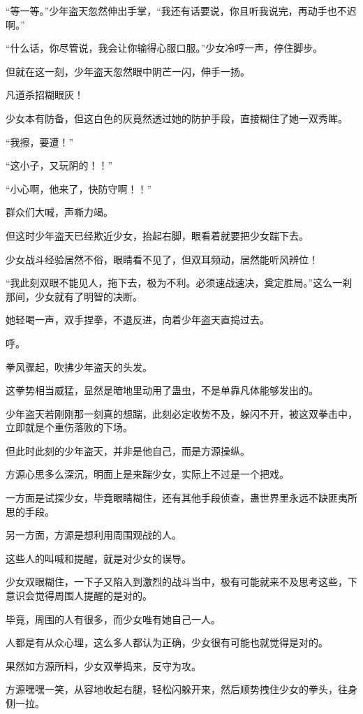 \begin{this_body}
“等一等。”少年盗天忽然伸出手掌，“我还有话要说，你且听我说完，再动手也不迟啊。”

“什么话，你尽管说，我会让你输得心服口服。”少女冷哼一声，停住脚步。

但就在这一刻，少年盗天忽然眼中阴芒一闪，伸手一扬。

凡道杀招糊眼灰！

少女本有防备，但这白色的灰竟然透过她的防护手段，直接糊住了她一双秀眸。

“我擦，要遭！”

“这小子，又玩阴的！！”

“小心啊，他来了，快防守啊！！”

群众们大喊，声嘶力竭。

但这时少年盗天已经欺近少女，抬起右脚，眼看着就要把少女踹下去。

少女战斗经验居然不俗，眼睛看不见了，但双耳频动，居然能听风辨位！

“我此刻双眼不能见人，拖下去，极为不利。必须速战速决，奠定胜局。”这么一刹那间，少女就有了明智的决断。

她轻喝一声，双手捏拳，不退反进，向着少年盗天直捣过去。

呼。

拳风骤起，吹拂少年盗天的头发。

这拳势相当威猛，显然是暗地里动用了蛊虫，不是单靠凡体能够发出的。

少年盗天若刚刚那一刻真的想踹，此刻必定收势不及，躲闪不开，被这双拳击中，立即就是个重伤落败的下场。

但此时此刻的少年盗天，并非是他自己，而是方源操纵。

方源心思多么深沉，明面上是来踹少女，实际上不过是一个把戏。

一方面是试探少女，毕竟眼睛糊住，还有其他手段侦查，蛊世界里永远不缺匪夷所思的手段。

另一方面，方源是想利用周围观战的人。

这些人的叫喊和提醒，就是对少女的误导。

少女双眼糊住，一下子又陷入到激烈的战斗当中，极有可能就来不及思考这些，下意识会觉得周围人提醒的是对的。

毕竟，周围的人有很多，而少女唯有她自己一人。

人都是有从众心理，这么多人都认为正确，少女很有可能也就觉得是对的。

果然如方源所料，少女双拳捣来，反守为攻。

方源嘿嘿一笑，从容地收起右腿，轻松闪躲开来，然后顺势拽住少女的拳头，往身侧一拉。


\end{this_body}
